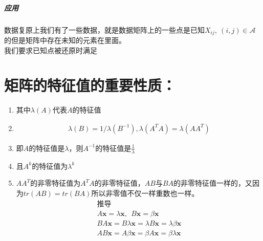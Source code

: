 \documentclass[12pt]{article}
\begin{document}
\begin{CJK*}{UTF8}{gbsn}
\subsubsection{应用}
数据复原上我们有了一些数据，就是数据矩阵上的一些点是已知$X_{ij},~(i,j)\in \mathscr{A} $的但是矩阵中存在未知的元素在里面。\\
我们要求已知点被还原时满足
\part{矩阵的特征值的重要性质：}
\large
\color{blue}
\begin{enumerate}
	\item 其中$\lambda(A)$代表$A$的特征值
	\item \begin{align*}
	\lambda(B)=1/\lambda(B^{-1}),\lambda(A^TA)=\lambda(AA^T)
\end{align*}
\item	即$A$的特征值是$\lambda$，则$A^{-1}$的特征值是$\frac{1}{\lambda}$
\item	且$A^{k}$的特征值为$\lambda^k$
\item $AA^T$的非零特征值为$A^TA$的非零特征值，$AB$与$BA$的非零特征值一样的，又因为$tr(AB)=tr(BA)$所以非零值不仅一样重数也一样。
\color{black}
\begin{align*}
\mbox{推导}\\
	A\bm x=\lambda \bm x,~~B\bm x=\beta \bm x\\
	BA\bm x=B\lambda \bm x=\lambda B\bm x=\lambda \beta \bm x\\
	AB\bm x=A\beta \bm x=\beta A\bm x=\beta\lambda  \bm x
\end{align*}
\end{enumerate}





\end{CJK*}
\end{document}
